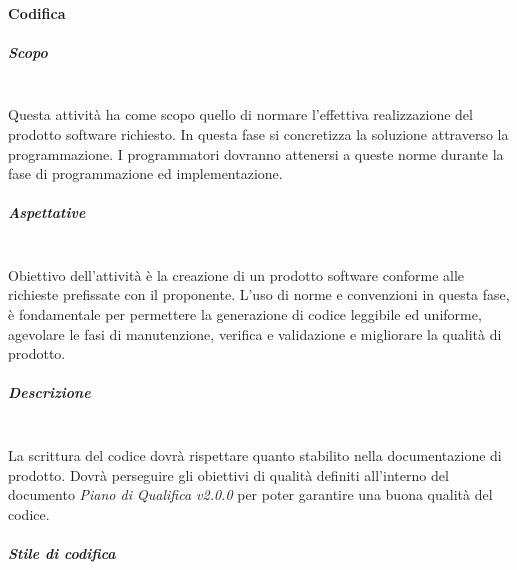 \paragraph{Codifica} 
\subparagraph{Scopo} \mbox{}\\

Questa attività ha come scopo quello di normare l'effettiva realizzazione del 
prodotto software richiesto. In questa fase si concretizza la soluzione 
attraverso la programmazione. I programmatori dovranno attenersi a queste norme 
durante la fase di programmazione ed implementazione. \newline
			
\subparagraph{Aspettative} \mbox{}\\

Obiettivo dell'attività è la creazione di un prodotto software conforme alle 
richieste prefissate con il proponente.
L'uso di norme e convenzioni in questa fase, è fondamentale per permettere la 
generazione di codice leggibile ed uniforme,  agevolare le fasi di manutenzione, 
verifica e validazione e migliorare la qualità di prodotto. \newline 

\subparagraph{Descrizione} \mbox{}\\

La scrittura del codice dovrà rispettare quanto stabilito nella 
documentazione di prodotto. Dovrà perseguire gli obiettivi di qualità definiti 
all'interno del documento \textit{Piano di Qualifica v2.0.0} per poter garantire 
una buona qualità del codice. \newline 

\subparagraph{Stile di codifica} \mbox{}\\

